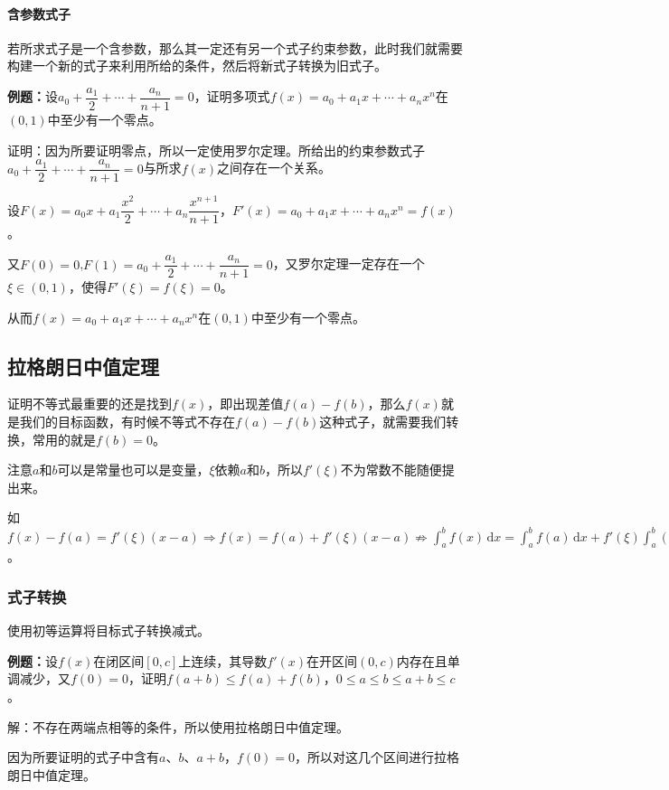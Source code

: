 \paragraph{含参数式子} \leavevmode \medskip

若所求式子是一个含参数，那么其一定还有另一个式子约束参数，此时我们就需要构建一个新的式子来利用所给的条件，然后将新式子转换为旧式子。

\textbf{例题：}设$a_0+\dfrac{a_1}{2}+\cdots+\dfrac{a_n}{n+1}=0$，证明多项式$f(x)=a_0+a_1x+\cdots+a_nx^n$在$(0,1)$中至少有一个零点。

证明：因为所要证明零点，所以一定使用罗尔定理。所给出的约束参数式子$a_0+\dfrac{a_1}{2}+\cdots+\dfrac{a_n}{n+1}=0$与所求$f(x)$之间存在一个关系。

设$F(x)=a_0x+a_1\dfrac{x^2}{2}+\cdots+a_n\dfrac{x^{n+1}}{n+1}$，$F'(x)=a_0+a_1x+\cdots+a_nx^n=f(x)$。

又$F(0)=0$,$F(1)=a_0+\dfrac{a_1}{2}+\cdots+\dfrac{a_n}{n+1}=0$，又罗尔定理一定存在一个$\xi\in(0,1)$，使得$F'(\xi)=f(\xi)=0$。

从而$f(x)=a_0+a_1x+\cdots+a_nx^n$在$(0,1)$中至少有一个零点。

\subsection{拉格朗日中值定理}

证明不等式最重要的还是找到$f(x)$，即出现差值$f(a)-f(b)$，那么$f(x)$就是我们的目标函数，有时候不等式不存在$f(a)-f(b)$这种式子，就需要我们转换，常用的就是$f(b)=0$。

注意$a$和$b$可以是常量也可以是变量，$\xi$依赖$a$和$b$，所以$f'(\xi)$不为常数不能随便提出来。

如$f(x)-f(a)=f'(\xi)(x-a)\Rightarrow f(x)=f(a)+f'(\xi)(x-a)\nRightarrow\int_a^bf(x)\,\textrm{d}x=\int_a^bf(a)\,\textrm{d}x+f'(\xi)\int_a^b(x-a)\,\textrm{d}x$。

\subsubsection{式子转换}

使用初等运算将目标式子转换减式。

\textbf{例题：}设$f(x)$在闭区间$[0,c]$上连续，其导数$f'(x)$在开区间$(0,c)$内存在且单调减少，又$f(0)=0$，证明$f(a+b)\leqslant f(a)+f(b)$，$0\leqslant a\leqslant b\leqslant a+b\leqslant c$。

解：不存在两端点相等的条件，所以使用拉格朗日中值定理。

因为所要证明的式子中含有$a$、$b$、$a+b$，$f(0)=0$，所以对这几个区间进行拉格朗日中值定理。

